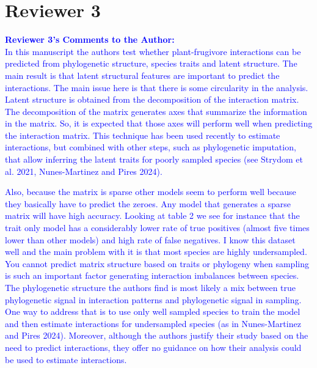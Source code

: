\documentclass{article}
\begin{document}
\section{Reviewer 3}
\textcolor{blue}{\textbf{Reviewer 3's Comments to the Author:} \\
In this manuscript the authors test whether plant-frugivore interactions can be predicted from phylogenetic structure, species traits and latent structure. The main result is that latent structural features are important to predict the interactions. The main issue here is that there is some circularity in the analysis. Latent structure is obtained from the decomposition of the interaction matrix. The decomposition of the matrix generates axes that summarize the information in the matrix. So, it is expected that those axes will perform well when predicting the interaction matrix. This technique has been used recently to estimate interactions, but combined with other steps, such as phylogenetic imputation, that allow inferring the latent traits for poorly sampled species (see Strydom et al. 2021, Nunes-Martinez and Pires 2024).}

\textcolor{blue}{Also, because the matrix is sparse other models seem to perform well because they basically have to predict the zeroes. Any model that generates a sparse matrix will have high accuracy. Looking at table 2 we see for instance that the trait only model has a considerably lower rate of true positives (almost five times lower than other models) and high rate of false negatives. I know this dataset well and the main problem with it is that most species are highly undersampled. You cannot predict matrix structure based on traits or phylogeny when sampling is such an important factor generating interaction imbalances between species. The phylogenetic structure the authors find is most likely a mix between true phylogenetic signal in interaction patterns and phylogenetic signal in sampling. One way to address that is to use only well sampled species to train the model and then estimate interactions for undersampled species (as in Nunes-Martinez and Pires 2024). Moreover, although the authors justify their study based on the need to predict interactions, they offer no guidance on how their analysis could be used to estimate interactions.}
\newline
\end{document}
